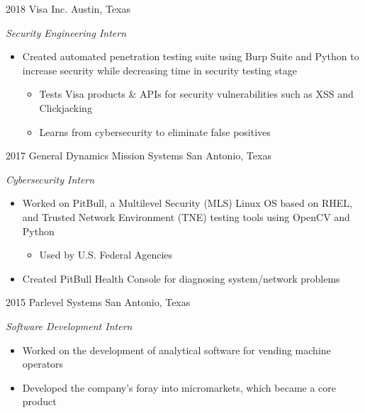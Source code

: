 \documentclass[]{friggeri-cv} %
\begin{document}
\begin{entrylist}

	\entry
	{2018}
	{Visa Inc.}
	{Austin, Texas}
	{\emph{Security Engineering Intern}
		\begin{itemize}
			\item Created automated penetration testing suite using Burp Suite and Python to increase security while decreasing time in security testing stage
			\begin{itemize}
				\item Tests Visa products \& APIs for security vulnerabilities such as XSS and Clickjacking
				\item Learns from cybersecurity to eliminate false positives
			\end{itemize}
		\end{itemize}
	}


	\entry
	{2017}
	{General Dynamics Mission Systems}
	{San Antonio, Texas}
	{\emph{Cybersecurity Intern}
		\begin{itemize}
			\item Worked on PitBull, a Multilevel Security (MLS) Linux OS based on RHEL, and Trusted Network Environment (TNE) testing tools using OpenCV and Python
			\begin{itemize}
				\item Used by U.S. Federal Agencies
			\end{itemize}
			\item Created PitBull Health Console for diagnosing system/network problems
		\end{itemize}
	}


	\entry
	{2015}
	{Parlevel Systems}
	{San Antonio, Texas}
	{\emph{Software Development Intern}
		\begin{itemize}
			\item Worked on the development of analytical software for vending machine operators
			\item Developed the company's foray into micromarkets, which became a core product
		\end{itemize}
	}

\end{entrylist}

\end{document}

